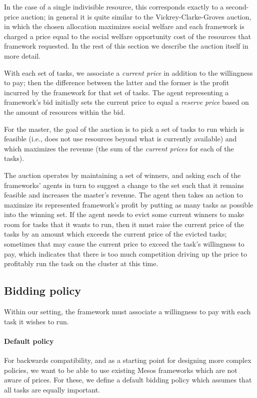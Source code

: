 \documentclass{acm_proc_article-sp}
\begin{document}
In the case of a single indivisible resource, this corresponds exactly
to a second-price auction; in general it is quite similar
to the Vickrey-Clarke-Groves auction, in which the chosen allocation
maximizes social welfare and each framework is charged a price
equal to the social welfare opportunity cost of the resources
that framework requested. In the rest of this section we describe the auction
itself in more detail.

With each set of tasks, we associate a \emph{current price} in addition to the
willingness to pay; then the difference between the latter and the former is the
profit incurred by the framework for that set of tasks. The agent representing a
framework's bid initially sets the current price to equal a \emph{reserve price}
based on the amount of resources within the bid.

For the master, the goal of the auction is to pick a set of tasks to run which
is feasible (i.e., does not use resources beyond what is currently available) and
which maximizes the revenue (the sum of the \emph{current prices} for each of the
tasks).

The auction operates by maintaining a set of winners, and asking each of
the frameworks' agents in turn to suggest a change to the set such that it
remains feasible and increases the master's revenue. The agent then takes an
action to maximize its represented framework's profit by putting as many tasks
as possible into the winning set. If the agent needs to evict some current
winners to make room for tasks that it wants to run, then it must raise the
current price of the tasks by an amount which exceeds the current price of the
evicted tasks; sometimes that may cause the current price to exceed the task's
willingness to pay, which indicates that there is too much competition driving
up the price to profitably run the task on the cluster at this time.

\subsection{Bidding policy}
Within our setting, the framework must associate a willingness to pay with each
task it wishes to run. 
\vspace{-5mm}
\paragraph{Default policy} For backwards compatibility, 
and as a starting point for designing more complex policies, we want to be able to
use existing Mesos frameworks which are not aware of prices. For these, we
define a default bidding policy which assumes that all tasks are equally
important.
\end{document}
